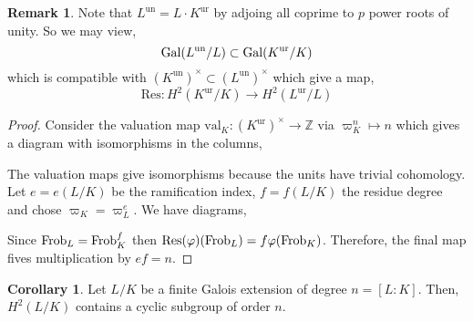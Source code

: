 \documentclass[12pt]{extarticle}
\newcommand{\Z}{\mathbb{Z}}
\newcommand{\Q}{\mathbb{Q}}
\theoremstyle{definition}
\newtheorem{corollary}[theorem]{Corollary}
\newtheorem{remark}[theorem]{Remark}
\begin{document}
\begin{remark}
Note that $L^{\text{un}} = L \cdot K^{\text{ur}}$ by adjoing all coprime to $p$ power roots of unity. So we may view,
\[ \mathrm{Gal} (L^{\text{un}} / L) \subset \mathrm{Gal} (K^{\text{ur}} / K) \]
which is compatible with $(K^\text{un})^\times \subset (L^\text{un})^\times$ which give a map,
\[ \mathrm{Res} : H^2(K^{\text{ur}} / K) \to H^2(L^{\text{ur}} / L) \]
\end{remark}


\newcommand{\sep}{\mathrm{sep}}
\newcommand{\ur}{\mathrm{ur}}
\newcommand{\Inf}{\mathrm{Inf}}
\newcommand{\Res}{\mathrm{Res}}


\begin{proof}
Consider the valuation map $\mathrm{val}_K : (K^\text{ur})^\times \to \Z$ via $\varpi_K^n \mapsto n$ which gives a diagram with isomorphisms in the columns,
\begin{center}
\end{center}
The valuation maps give isomorphisms because the units have trivial cohomology. Let $e = e(L / K)$ be the ramification index, $f = f(L/K)$ the residue degree and chose $\varpi_K = \varpi_L^e$. We have diagrams,
\begin{center}
\end{center}
Since $\mathrm{Frob}_L = \mathrm{Frob}_K^f$ then $\Res(\varphi)(\Frob_L) = f \varphi(\Frob_K)$. 
Therefore, the final map fives multiplication by $ef = n$. 
\end{proof}

\begin{corollary}
Let $L / K$ be a finite Galois extension of degree $n = [L : K]$. Then, $H^2(L/K)$ contains a cyclic subgroup of order $n$.
\end{corollary}
\end{document}
